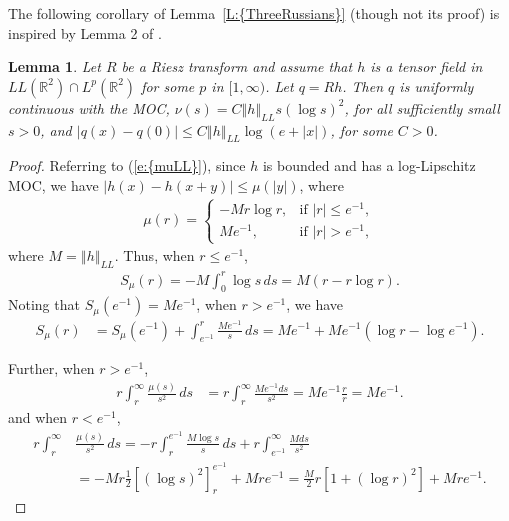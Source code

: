 \documentclass[reqno,openright,11pt,twoside]{amsart}
\newtheorem{lemma}[theorem]{Lemma}
\theoremstyle{definition}
\numberwithin{equation}{section}
\begin{document}
The following corollary of {Lemma~\ref{L:{ThreeRussians}}} (though not its proof) is inspired by Lemma 2 of \cite{Serfati1995B}.
\begin{lemma}\label{L:pDecay}
    Let $R$ be a Riesz transform
    and assume that $h$ is a tensor field in $LL({\ensuremath{{\ensuremath{\mathbb{{R}}}}}}^2) \cap L^p({\ensuremath{{\ensuremath{\mathbb{{R}}}}}}^2)$
    for some $p$ in $[1, {\ensuremath{\infty}})$. Let $q = R h$.
    Then $q$ is uniformly continuous with the MOC,
    $\nu(s) = C {\ensuremath{\left\Vert {h} \right\Vert}}_{LL} s (\log s)^2$,
    for all sufficiently small $s > 0$, and ${\left\vert{q(x) - q(0)}\right\vert} \le
    C {\ensuremath{\left\Vert {h} \right\Vert}}_{LL} \log(e +{\left\vert{x}\right\vert})$, for some $C > 0$.
\end{lemma}
\begin{proof}
Referring to {(\ref{e:{muLL}})}, since $h$ is bounded and has a log-Lipschitz MOC, we have ${\left\vert{h(x) - h(x + y)}\right\vert} \le \mu({\left\vert{y}\right\vert})$, where
\begin{align*}
	\mu(r)
		= \left\{
			\begin{array}{rl}
				-M r \log r, & \text{if } {\left\vert{r}\right\vert} \le e^{-1}, \\
				M e^{-1}, & \text{if } {\left\vert{r}\right\vert} > e^{-1},
			\end{array}
		\right.
\end{align*}
where $M = {\ensuremath{\left\Vert {h} \right\Vert}}_{LL}$.
Thus, when $r \le e^{-1}$,
\begin{align*}
	S_\mu(r)
		= -M \int_0^r \log s \, ds
		= M (r - r \log r).
\end{align*}
Noting that $S_\mu(e^{-1}) = M e^{-1}$, when $r > e^{-1}$, we have
\begin{align*}
	S_\mu(r)
		&= S_\mu(e^{-1}) + \int_{e^{-1}}^r \frac{M e^{-1}}{s} \, ds
		= M e^{-1} + M e^{-1} (\log r - \log e^{-1}).
\end{align*}

Further, when $r > e^{-1}$,
\begin{align*}
	r \int_r^{\ensuremath{\infty}} \frac{\mu(s)}{s^2} \, ds
		&= r \int_r^{\ensuremath{\infty}} \frac{M e^{-1} ds}{s^2}
		= M e^{-1}\frac{r}{r}
		= M e^{-1}.
\end{align*}
and when $r < e^{-1}$,
\begin{align*}
	r \int_r^{\ensuremath{\infty}} &\frac{\mu(s)}{s^2} \, ds
		= - r \int_r^{e^{-1}} \frac{M \log s}{s} \, ds
			+ r \int_{e^{-1}}^{\ensuremath{\infty}} \frac{M ds}{s^2} \\
		&= -M r \frac{1}{2} {\ensuremath{\left[ {(\log s)^2} \right]}}_r^{e^{-1}} + M r e^{-1}
		= \frac{M}{2} r {\ensuremath{\left[ {1 + (\log r)^2} \right]}} + M r e^{-1}.
\end{align*}


\end{proof}
\end{document}

